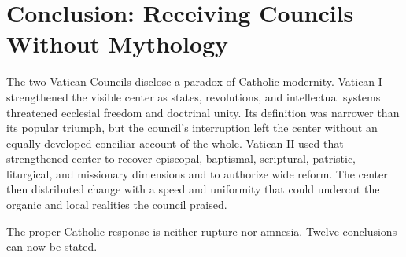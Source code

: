 \section{Conclusion: Receiving Councils Without Mythology}

The two Vatican Councils disclose a paradox of Catholic modernity. Vatican I strengthened the visible center as states, revolutions, and intellectual systems threatened ecclesial freedom and doctrinal unity. Its definition was narrower than its popular triumph, but the council's interruption left the center without an equally developed conciliar account of the whole. Vatican II used that strengthened center to recover episcopal, baptismal, scriptural, patristic, liturgical, and missionary dimensions and to authorize wide reform. The center then distributed change with a speed and uniformity that could undercut the organic and local realities the council praised.

The proper Catholic response is neither rupture nor amnesia. Twelve conclusions can now be stated.

